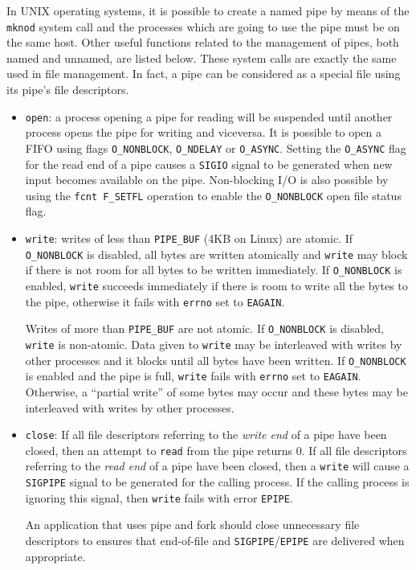 \medskip
In UNIX operating systems, it is possible to create a named pipe by means of the \texttt{mknod} system call and the processes which are going to use the pipe must be on the same host. Other useful functions related to the management of pipes, both named and unnamed, are listed below. These system calls are exactly the same used in file management. In fact, a pipe can be considered as a special file using its pipe’s file descriptors.
\begin{itemize}
\item \texttt{open}: a process opening a pipe for reading will be suspended until another process opens the pipe for writing and viceversa. It is possible to open a FIFO using flags \texttt{O\_NONBLOCK}, \texttt{O\_NDELAY} or \texttt{O\_ASYNC}. Setting the \texttt{O\_ASYNC} flag for the read end of a pipe causes a \texttt{SIGIO} signal to be generated when new input becomes available on the pipe. Non-blocking I/O is also possible by using the \texttt{fcnt F\_SETFL} operation to enable the \texttt{O\_NONBLOCK} open file status flag.
\item \texttt{write}: writes of less than \texttt{PIPE\_BUF} (4KB on Linux) are atomic. If \texttt{O\_NONBLOCK} is disabled, all bytes are written atomically and \texttt{write} may block if there is not room for all bytes to be written immediately. If \texttt{O\_NONBLOCK} is enabled, \texttt{write} succeeds immediately if there is room to write all the bytes to the pipe, otherwise it fails with \texttt{errno} set to \texttt{EAGAIN}.

Writes of more than \texttt{PIPE\_BUF} are not atomic. If \texttt{O\_NONBLOCK} is disabled, \texttt{write} is non-atomic. Data given to \texttt{write} may be interleaved with writes by other processes and it blocks until all bytes have been written. If \texttt{O\_NONBLOCK} is enabled and the pipe is full, \texttt{write} fails with \texttt{errno} set to \texttt{EAGAIN}. Otherwise, a ``partial write'' of some bytes may occur and these bytes may be interleaved with writes by other processes.
\item \texttt{close}: If all file descriptors referring to the \emph{write end} of a pipe have been closed, then an attempt to \texttt{read} from the pipe returns 0. If all file descriptors referring to the \emph{read end} of a pipe have been closed, then a \texttt{write} will cause a \texttt{SIGPIPE} signal to be generated for the calling process. If the calling process is ignoring this signal, then \texttt{write} fails with error \texttt{EPIPE}.

An application that uses pipe and fork should close unnecessary file descriptors to ensures that end-of-file and \texttt{SIGPIPE}/\texttt{EPIPE} are delivered when appropriate.
\end{itemize}

